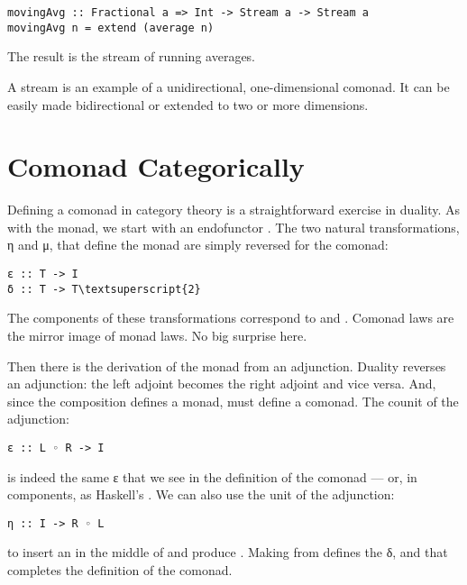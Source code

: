 \begin{Verbatim}[commandchars=\\\{\}]
movingAvg :: Fractional a => Int -> Stream a -> Stream a
movingAvg n = extend (average n)
\end{Verbatim}
The result is the stream of running averages.

A stream is an example of a unidirectional, one-dimensional comonad. It
can be easily made bidirectional or extended to two or more dimensions.

\section{Comonad Categorically}\label{comonad-categorically}

Defining a comonad in category theory is a straightforward exercise in
duality. As with the monad, we start with an endofunctor . The
two natural transformations, η and μ, that define the monad are simply
reversed for the comonad:

\begin{Verbatim}[commandchars=\\\{\}]
ε :: T -> I
δ :: T -> T\textsuperscript{2}
\end{Verbatim}
The components of these transformations correspond to 
and . Comonad laws are the mirror image of monad laws.
No big surprise here.

Then there is the derivation of the monad from an adjunction. Duality
reverses an adjunction: the left adjoint becomes the right adjoint and
vice versa. And, since the composition  defines a monad,
 must define a comonad. The counit of the adjunction:

\begin{Verbatim}[commandchars=\\\{\}]
ε :: L ◦ R -> I
\end{Verbatim}
is indeed the same ε that we see in the definition of the comonad ---
or, in components, as Haskell's . We can also use the
unit of the adjunction:

\begin{Verbatim}[commandchars=\\\{\}]
η :: I -> R ◦ L
\end{Verbatim}
to insert an  in the middle of  and
produce . Making  from 
defines the δ, and that completes the definition of the comonad.


